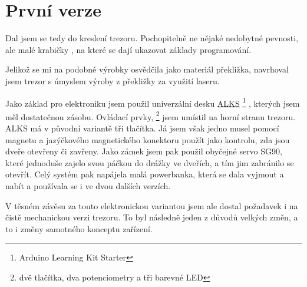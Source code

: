 \section{První verze}
\label{E1-vyvoj}

Dal jsem se tedy do kreslení trezoru. Pochopitelně ne nějaké nedobytné pevnosti, ale malé
krabičky \parencite{128x128mm}, na které se dají ukazovat základy programování. 

Jelikož se mi na podobné výrobky osvědčila jako materiál překližka, navrhoval jsem trezor s úmyslem výroby z překližky za využití laseru. 

Jako základ pro elektroniku  jsem použil univerzální 
desku \href{https://github.com/RoboticsBrno/ArduinoLearningKitStarter}{ALKS} \footnote{Arduino Learning Kit Starter} \parencite{ALKS}, 
kterých jsem měl dostatečnou zásobu. Ovládací prvky, \footnote{dvě tlačítka, dva potenciometry a tři barevné LED} jsem umístil na horní stranu trezoru. 
ALKS má v původní variantě tři tlačítka. Já jsem však jedno musel pomocí magnetu a jazýčkového magnetického konektoru použít
jako kontrolu, zda jsou dveře otevřeny či zavřeny. Jako zámek jsem pak použil obyčejné servo
SG90, které jednoduše zajelo svou páčkou do drážky ve dveřích, a tím jim zabránilo 
se otevřít. Celý systém pak napájela malá powerbanka, která se dala vyjmout a nabít  
a používala se i ve dvou dalších verzích.


V těsném závěsu za touto elektronickou variantou jsem ale dostal požadavek i na čistě mechanickou verzi trezoru. 
To byl následně jeden z důvodů velkých změn, a to i změny samotného konceptu zařízení.

\newpage